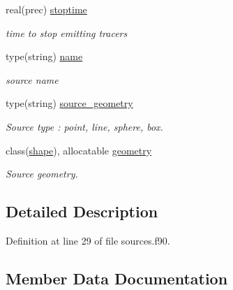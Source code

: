 \begin{DoxyCompactItemize}
real(prec) \mbox{\hyperlink{structsources__mod_1_1source__par_ac5270ce3b0124a710527f4fa60ce30bc}{stoptime}}
\begin{DoxyCompactList}\small\item\em time to stop emitting tracers \end{DoxyCompactList}\item 
type(string) \mbox{\hyperlink{structsources__mod_1_1source__par_ac56d7761e7da3a906a3f0fbf4c7f49f8}{name}}
\begin{DoxyCompactList}\small\item\em source name \end{DoxyCompactList}\item 
type(string) \mbox{\hyperlink{structsources__mod_1_1source__par_a66e7627f128290f25c2c9eb36808eb5b}{source\+\_\+geometry}}
\begin{DoxyCompactList}\small\item\em Source type \+: \textquotesingle{}point\textquotesingle{}, \textquotesingle{}line\textquotesingle{}, \textquotesingle{}sphere\textquotesingle{}, \textquotesingle{}box\textquotesingle{}. \end{DoxyCompactList}\item 
class(\mbox{\hyperlink{structgeometry__mod_1_1shape}{shape}}), allocatable \mbox{\hyperlink{structsources__mod_1_1source__par_abf09d59fd65f02d1a8139e2f9f477207}{geometry}}
\begin{DoxyCompactList}\small\item\em Source geometry. \end{DoxyCompactList}\end{DoxyCompactItemize}


\subsection{Detailed Description}


Definition at line 29 of file sources.\+f90.



\subsection{Member Data Documentation}
\mbox{\label{structsources__mod_1_1source__par_a957d4184d9cd997abeac05c04821139c}} 

